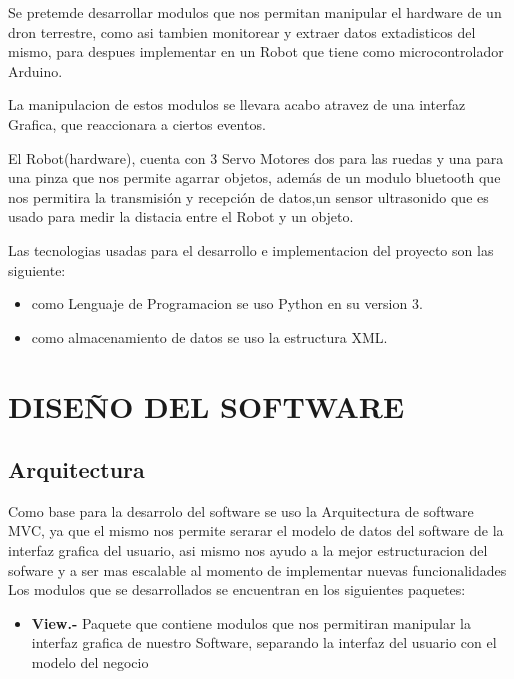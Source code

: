 \documentclass[letterpaper,12pt]{article}
\begin{document}
{Se pretemde desarrollar modulos que nos permitan manipular el hardware de un dron terrestre, como asi tambien monitorear y extraer datos extadisticos del  mismo, para despues implementar en un Robot que tiene como microcontrolador Arduino.

La manipulacion de estos modulos se llevara acabo atravez de una interfaz Grafica, que reaccionara a ciertos eventos.

El Robot(hardware), cuenta con 3 Servo Motores dos para las ruedas y una para una pinza que nos permite agarrar objetos, además de un modulo bluetooth que nos permitira la transmisión y recepción de datos,un sensor ultrasonido que es usado para medir la distacia entre el Robot y un objeto.

Las tecnologias usadas para el desarrollo e implementacion del proyecto son las siguiente:

\begin{itemize}
	\item como Lenguaje de Programacion se uso Python en su version 3.
	
	\item como almacenamiento de datos se uso la estructura XML.
		
\end{itemize}


\section{DISEÑO DEL SOFTWARE}


\subsection{Arquitectura}

Como base para la desarrolo del software se uso la Arquitectura de software MVC, ya que el mismo nos permite serarar el modelo de datos del software de la interfaz grafica del usuario, asi mismo nos ayudo a la mejor estructuracion del sofware y a ser mas escalable al momento de implementar nuevas funcionalidades\\

Los modulos que se desarrollados se encuentran en los siguientes paquetes:
\begin{itemize}
	\item \textbf{View.- } Paquete que contiene modulos que nos permitiran manipular la interfaz grafica de nuestro Software, separando la interfaz del usuario con el modelo del negocio
	

\end{itemize}}
\end{document}
